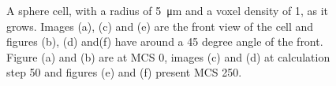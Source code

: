 \begin{figure}[ht]
\begin{center}
{	}
	\end{center}
	\caption[Growth of a sphere cell with a radius of 5]{\label{img:GrowthSphereCellRadius5}A sphere cell, with a radius of \SI{5}{\micro\metre} and a voxel density of 1, as it grows. Images (a), (c) and (e) are the front view of the cell and figures (b), (d) and(f) have around a 45 degree angle of the front. Figure (a) and (b) are at \ac{MCS} 0, images (c) and (d) at calculation step 50 and figures (e) and (f) present \ac{MCS} 250.}
\end{figure}

